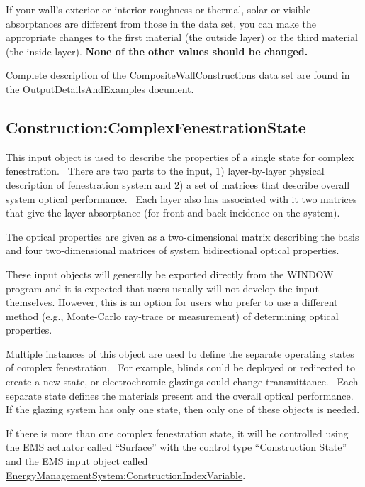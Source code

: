 If your wall's exterior or interior roughness or thermal, solar or visible absorptances are different from those in the data set, you can make the appropriate changes to the first material (the outside layer) or the third material (the inside layer). \textbf{None of the other values should be changed.}

\begin{callout}
Complete description of the CompositeWallConstructions data set are found in the OutputDetailsAndExamples document.
\end{callout}

\subsection{Construction:ComplexFenestrationState}\label{constructioncomplexfenestrationstate}

This input object is used to describe the properties of a single state for complex fenestration.~ There are two parts to the input, 1) layer-by-layer physical description of fenestration system and 2) a set of matrices that describe overall system optical performance.~ Each layer also has associated with it two matrices that give the layer absorptance (for front and back incidence on the system).

The optical properties are given as a two-dimensional matrix describing the basis and four two-dimensional matrices of system bidirectional optical properties.

These input objects will generally be exported directly from the WINDOW program and it is expected that users usually will not develop the input themselves. However, this is an option for users who prefer to use a different method (e.g., Monte-Carlo ray-trace or measurement) of determining optical properties.

Multiple instances of this object are used to define the separate operating states of complex fenestration.~ For example, blinds could be deployed or redirected to create a new state, or electrochromic glazings could change transmittance.~ Each separate state defines the materials present and the overall optical performance.~ If the glazing system has only one state, then only one of these objects is needed.

If there is more than one complex fenestration state, it will be controlled using the EMS actuator called ``Surface'' with the control type ``Construction State'' and the EMS input object called \hyperref[energymanagementsystemconstructionindexvariable]{EnergyManagementSystem:ConstructionIndexVariable}.

